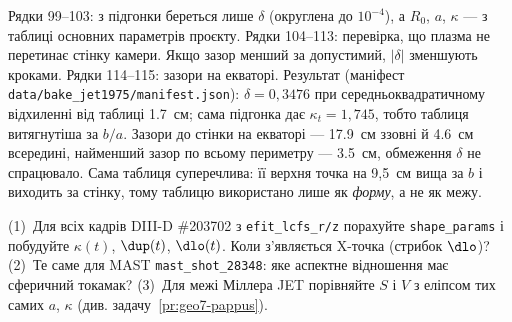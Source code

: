 \noindent Рядки 99--103: з підгонки береться лише $\delta$ (округлена до $10^{-4}$), а $R_0$, $a$, $\kappa$ --- з таблиці основних параметрів проєкту. Рядки 104--113: перевірка, що плазма не перетинає стінку камери. Якщо зазор менший за допустимий, $|\delta|$ зменшують кроками. Рядки 114--115: зазори на екваторі. Результат (маніфест \texttt{data/bake\_jet1975/manifest.json}): $\delta=0{,}3476$ при середньоквадратичному відхиленні від таблиці \SI{1,7}{см}; сама підгонка дає $\kappa_t=1{,}745$, тобто таблиця витягнутіша за $b/a$. Зазори до стінки на екваторі --- \SI{17,9}{см} ззовні й \SI{4,6}{см} всередині, найменший зазор по всьому периметру --- \SI{3,5}{см}, обмеження $\delta$ не спрацювало. Сама таблиця суперечлива: її верхня точка на 9,5~см вища за $b$ і виходить за стінку, тому таблицю використано лише як \emph{форму}, а не як межу.

\begin{practicum}
(1)~Для всіх кадрів DIII-D \#203702 з \texttt{efit\_lcfs\_r/z} порахуйте \texttt{shape\_params} і побудуйте $\kappa(t)$, $\dup(t)$, $\dlo(t)$. Коли з'являється X-точка (стрибок $\dlo$)? (2)~Те саме для MAST \texttt{mast\_shot\_28348}: яке аспектне відношення має сферичний токамак? (3)~Для межі Міллера JET порівняйте $S$ і $V$ з еліпсом тих самих $a$, $\kappa$ (див. задачу~\ref{pr:geo7-pappus}).
\end{practicum}
